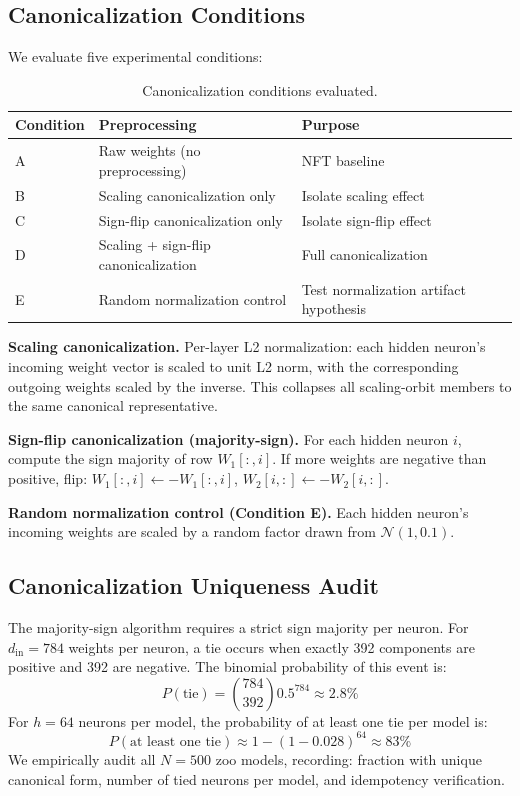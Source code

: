 \subsection{Canonicalization Conditions}

We evaluate five experimental conditions:

\begin{table}[h]
\centering
\caption{Canonicalization conditions evaluated.}
\label{tab:conditions}
\begin{tabular}{llp{5cm}}
\toprule
Condition & Preprocessing & Purpose \\
\midrule
A & Raw weights (no preprocessing) & NFT baseline \\
B & Scaling canonicalization only & Isolate scaling effect \\
C & Sign-flip canonicalization only & Isolate sign-flip effect \\
D & Scaling + sign-flip canonicalization & Full canonicalization \\
E & Random normalization control & Test normalization artifact hypothesis \\
\bottomrule
\end{tabular}
\end{table}

\textbf{Scaling canonicalization.} Per-layer L2 normalization: each hidden neuron's incoming weight vector is scaled to unit L2 norm, with the corresponding outgoing weights scaled by the inverse. This collapses all scaling-orbit members to the same canonical representative.

\textbf{Sign-flip canonicalization (majority-sign).} For each hidden neuron $i$, compute the sign majority of row $W_1[:, i]$. If more weights are negative than positive, flip: $W_1[:, i] \leftarrow -W_1[:, i]$, $W_2[i, :] \leftarrow -W_2[i, :]$.

\textbf{Random normalization control (Condition E).} Each hidden neuron's incoming weights are scaled by a random factor drawn from $\mathcal{N}(1, 0.1)$.

\subsection{Canonicalization Uniqueness Audit}

The majority-sign algorithm requires a strict sign majority per neuron. For $d_{\mathrm{in}}=784$ weights per neuron, a tie occurs when exactly 392 components are positive and 392 are negative. The binomial probability of this event is:
\begin{equation}
P(\text{tie}) = \binom{784}{392} 0.5^{784} \approx 2.8\%
\end{equation}
For $h=64$ neurons per model, the probability of at least one tie per model is:
\begin{equation}
P(\text{at least one tie}) \approx 1 - (1 - 0.028)^{64} \approx 83\%
\end{equation}
We empirically audit all $N=500$ zoo models, recording: fraction with unique canonical form, number of tied neurons per model, and idempotency verification.

